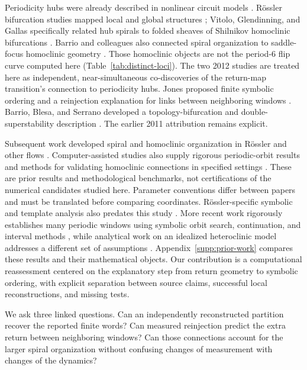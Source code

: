 Periodicity hubs were already described in nonlinear circuit models
\citep{bonatto2008periodicity}. R{\"o}ssler bifurcation studies mapped local
and global structures \citep{barrio2009qualitative}; Vitolo, Glendinning,
and Gallas specifically related hub spirals to folded sheaves of Shilnikov
homoclinic bifurcations \citep{vitolo2011global}. Barrio and colleagues
also connected spiral organization to saddle-focus homoclinic geometry
\citep{barrio2011global}. Those homoclinic objects are not the period-6
flip curve computed here (Table~\ref{tab:distinct-loci}).
The two 2012 studies are treated here as independent, near-simultaneous
co-discoveries of the return-map transition's connection to periodicity
hubs. Jones proposed finite symbolic ordering and a reinjection explanation
for links between neighboring windows \citep{jones2012topological}.
Barrio, Blesa, and Serrano developed a topology-bifurcation and
double-superstability description \citep{barrio2012topological}.
The earlier 2011 attribution remains explicit.

Subsequent work developed spiral and homoclinic organization in R{\"o}ssler
and other flows \citep{barrio2013spirals,malykh2020homoclinic}.
Computer-assisted studies also supply rigorous periodic-orbit results and
methods for validating homoclinic connections in specified settings
\citep{gierzkiewicz2021periodic,capinski2017homoclinics,nitta2022verification}.
These are prior results and methodological benchmarks, not certifications
of the numerical candidates studied here. Parameter conventions differ
between papers and must be translated before comparing coordinates.
R{\"o}ssler-specific symbolic and template analysis also predates this study
\citep{letellier1995unstable}. More recent work rigorously establishes many
periodic windows using symbolic orbit search, continuation, and interval
methods \citep{galias2025symbolic}, while analytical work on an idealized
heteroclinic model addresses a different set of assumptions
\citep{igra2025knots}. Appendix~\ref{supp:prior-work} compares these results
and their mathematical objects. Our contribution is a computational
reassessment centered on the explanatory
step from return geometry to symbolic ordering, with explicit separation
between source claims, successful local reconstructions, and missing tests.

We ask three linked questions. Can an independently reconstructed partition
recover the reported finite words? Can measured reinjection predict the
extra return between neighboring windows? Can those connections account for
the larger spiral organization without confusing changes of measurement
with changes of the dynamics?

